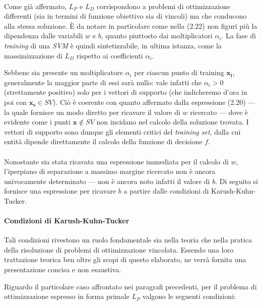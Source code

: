 \paragraph{}
Come già affermato, $L_P$ e $L_D$ corrispondono a problemi di ottimizzazione differenti (sia in termini di funzione obiettivo sia di vincoli) ma che conducono alla stessa soluzione. È da notare in particolare come nella (2.22) non figuri più la dipendenza dalle variabili $w$ e $b$, quanto piuttosto dai moltiplicatori $\alpha_i$. La fase di \textit{training} di una \textit{SVM} è quindi sintetizzabile, in ultima istanza, come la massimizzazione di $L_D$ rispetto ai coefficienti $\alpha_i$.

Sebbene sia presente un moltiplicatore $\alpha_i$ per ciascun punto di training $\boldsymbol{x_i}$, generalmente la maggior parte di essi sarà nullo: vale infatti che $\alpha_i > 0$ (strettamente positivo) solo per i vettori di supporto (che indicheremo d'ora in poi con $\boldsymbol{x_s} \in SV$).
Ciò è coerente con quanto affermato dalla espressione (2.20) --- la quale fornisce un modo diretto per ricavare il valore di $w$ ricercato --- dove è evidente come i punti $\boldsymbol x \not\in SV$ non incidano nel calcolo della soluzione trovata.
I vettori di supporto sono dunque gli elementi critici del \textit{training set}, dalla cui entità dipende direttamente il calcolo della funzione di decisione $f$. 

\paragraph{}
Nonostante sia stata ricavata una espressione immediata per il calcolo di $w$, l'iperpiano di separazione a massimo margine ricercato non è ancora univocamente determinato --- non è ancora noto infatti il valore di $b$.
Di seguito si fornisce una espressione per ricavare $b$ a partire dalle condizioni di Karush-Kuhn-Tucker.

\paragraph{Condizioni di Karush-Kuhn-Tucker}
Tali condizioni rivestono un ruolo fondamentale sia nella teoria che nella pratica della risoluzione di problemi di ottimizzazione vincolata. Essendo una loro trattazione teorica ben oltre gli scopi di questo elaborato, ne verrà fornita una presentazione concisa e non esaustiva.

Riguardo il particolare caso affrontato nei paragrafi precedenti, per il problema di ottimizzazione espresso in forma primale $L_P$ valgono le seguenti condizioni:

